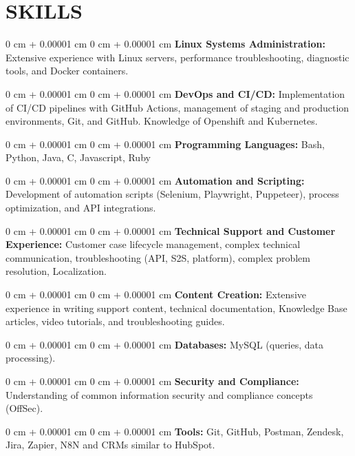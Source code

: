 \documentclass[10pt, letterpaper]{article}
\newenvironment{onecolentry}{
    \begin{adjustwidth}{
        0 cm + 0.00001 cm
    }{
        0 cm + 0.00001 cm
    }
}{
    \end{adjustwidth}
}
\begin{document}
\section{SKILLS}
\begin{onecolentry}{\textbf{Linux Systems Administration:} Extensive experience with Linux servers, performance troubleshooting, diagnostic tools, and Docker containers.}\end{onecolentry}
\vspace{0.1cm}
\begin{onecolentry}{\textbf{DevOps and CI/CD:} Implementation of CI/CD pipelines with GitHub Actions, management of staging and production environments, Git, and GitHub. Knowledge of Openshift and Kubernetes.}\end{onecolentry}
\vspace{0.1cm}
\begin{onecolentry}{\textbf{Programming Languages:} Bash, Python, Java, C, Javascript, Ruby}\end{onecolentry}
\vspace{0.1cm}
\begin{onecolentry}{\textbf{Automation and Scripting:} Development of automation scripts (Selenium, Playwright, Puppeteer), process optimization, and API integrations.}\end{onecolentry}
\vspace{0.1cm}
\begin{onecolentry}{\textbf{Technical Support and Customer Experience:} Customer case lifecycle management, complex technical communication, troubleshooting (API, S2S, platform), complex problem resolution, Localization.}\end{onecolentry}
\vspace{0.1cm}
\begin{onecolentry}{\textbf{Content Creation:} Extensive experience in writing support content, technical documentation, Knowledge Base articles, video tutorials, and troubleshooting guides.}\end{onecolentry}
\vspace{0.1cm}
\begin{onecolentry}{\textbf{Databases:} MySQL (queries, data processing).}\end{onecolentry}
\vspace{0.1cm}
\begin{onecolentry}{\textbf{Security and Compliance:} Understanding of common information security and compliance concepts (OffSec).}\end{onecolentry}
\vspace{0.1cm}
\begin{onecolentry}{\textbf{Tools:} Git, GitHub, Postman, Zendesk, Jira, Zapier, N8N and CRMs similar to HubSpot.}\end{onecolentry}
\end{document}

